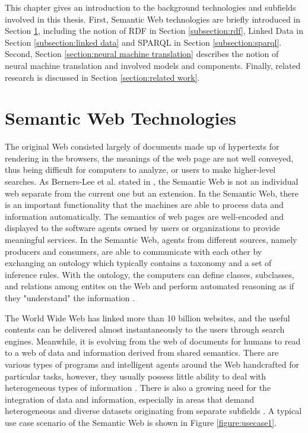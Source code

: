 
This chapter gives an introduction to the background technologies and subfields involved in this thesis. First, Semantic Web technologies are briefly introduced in Section \ref{section:semantic web technologies}, including the notion of RDF in Section \ref{subsection:rdf}, Linked Data in Section \ref{subsection:linked data} and SPARQL in Section \ref{subsection:sparql}. Second, Section \ref{section:neural machine translation} describes the notion of neural machine translation and involved models and components. Finally, related research is discussed in Section \ref{section:related work}.

\section{Semantic Web Technologies} \label{section:semantic web technologies}

The original Web consisted largely of documents made up of hypertexts for rendering in the browsers, the meanings of the web page are not well conveyed, thus being difficult for computers to analyze, or users to make higher-level searches. As Berners-Lee et al. stated in \cite{Berners-Lee2001}, the Semantic Web is not an individual web separate from the current one but an extension. In the Semantic Web, there is an important functionality that the machines are able to process data and information automatically. The semantics of web pages are well-encoded and displayed to the software agents owned by users or organizations to provide meaningful services. In the Semantic Web, agents from different sources, namely producers and consumers, are able to communicate with each other by exchanging an ontology which typically contains a taxonomy and a set of inference rules. With the ontology, the computers can define classes, subclasses, and relations among entites on the Web and perform automated reasoning as if they "understand" the information \cite{Berners-Lee2001}.

The World Wide Web has linked more than 10 billion websites, and the useful contents can be delivered almost instantaneously to the users through search engines. Meanwhile, it is evolving from the web of documents for humans to read to a web of data and information derived from shared semantics. There are various types of programs and intelligent agents around the Web handcrafted for particular tasks, however, they usually possess little ability to deal with heterogeneous types of information \cite{Shadbolt2006}. There is also a growing need for the integration of data and information, especially in areas that demand heterogeneous and diverse datasets originating from separate subfields \cite{Shadbolt2006}. A typical use case scenario of the Semantic Web is shown in Figure \ref{figure:usecase1}.

